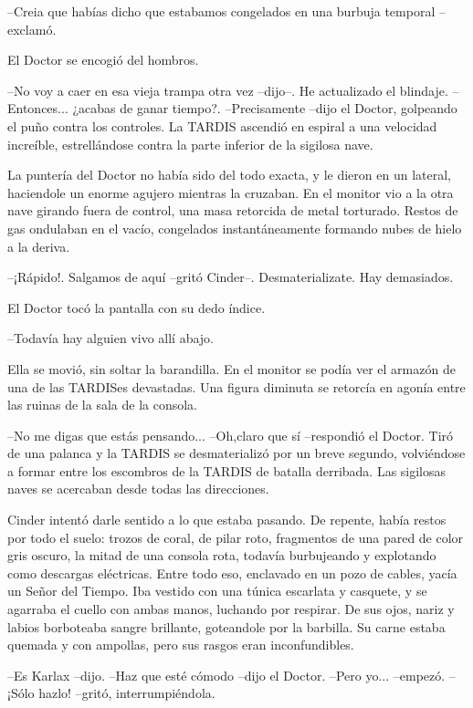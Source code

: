 --Creia que habías dicho que estabamos congelados en una burbuja temporal --exclamó.

El Doctor se encogió del hombros. 

--No voy a caer en esa vieja trampa otra vez --dijo--. He actualizado el blindaje.
--Entonces... ¿acabas de ganar tiempo?.
--Precisamente --dijo el Doctor, golpeando el puño contra los controles. La TARDIS ascendió en espiral a una velocidad increíble, estrellándose contra la parte inferior de la sigilosa nave.

La puntería del Doctor no había sido del todo exacta, y le dieron en un lateral, haciendole un enorme agujero mientras la cruzaban. En el monitor vio a la otra nave girando fuera de control, una masa retorcida de metal torturado. Restos de gas ondulaban en el vacío, congelados instantáneamente formando nubes de hielo a la deriva.

--¡Rápido!. Salgamos de aquí --gritó Cinder--. Desmaterializate. Hay demasiados.

El Doctor tocó la pantalla con su dedo índice. 

--Todavía hay alguien vivo allí abajo.

Ella se movió, sin soltar la barandilla. En el monitor se podía ver el armazón de una de las TARDISes devastadas. Una figura diminuta se retorcía en agonía entre las ruinas de la sala de la consola.

--No me digas que estás pensando...
--Oh,claro que sí --respondió el Doctor. Tiró de una palanca y la TARDIS se desmaterializó por un breve segundo, volviéndose a formar entre los escombros de la TARDIS de batalla derribada. Las sigilosas naves se acercaban desde todas las direcciones.

Cinder intentó darle sentido a lo que estaba pasando. De repente, había restos por todo el suelo: trozos de coral, de pilar roto, fragmentos de una pared de color gris oscuro, la mitad de una consola rota, todavía burbujeando y explotando como descargas eléctricas. Entre todo eso, enclavado en un pozo de cables, yacía un Señor del Tiempo.
Iba vestido con una túnica escarlata y casquete, y se agarraba el cuello con ambas manos, luchando por respirar. De sus ojos, nariz y labios borboteaba sangre brillante, goteandole por la barbilla. Su carne estaba quemada y con ampollas, pero sus rasgos eran inconfundibles. 

--Es Karlax --dijo.
--Haz que esté cómodo --dijo el Doctor.
--Pero yo... --empezó.
--¡Sólo hazlo! --gritó, interrumpiéndola.

